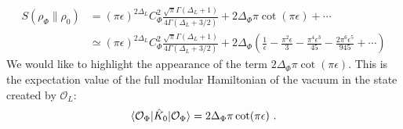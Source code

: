 \documentclass[11pt]{article}
\newcommand{\ep}{\epsilon}
\newcommand{\mO}{\mathcal{O}}
\newcommand{\nn}{\nonumber}
\newcommand{\lb}{\left(}
\newcommand{\rb}{\right)}
\begin{document}
\begin{align}
  S(\rho_\Phi\|\rho_0)&=(\pi \ep)^{2\Delta_L}C_{\Phi}^2\frac{\sqrt{\pi}\Gamma(\Delta_L+1)}{4\Gamma(\Delta_L+3/2)} + 2\Delta_\Phi \pi \cot(\pi \ep) + \cdots \nn \\ 
&\simeq (\pi \ep)^{2\Delta_L}C_{\Phi}^2\frac{\sqrt{\pi}\Gamma(\Delta_L+1)}{4\Gamma(\Delta_L+3/2)}  +2\Delta_\Phi\lb \frac{1}{\ep} - \frac{\pi^2 \ep}{3} - \frac{\pi^4 \ep^3}{45} - \frac{2\pi^6 \ep^5}{945} + \cdots\rb 
\end{align}
We would like to highlight the appearance of the term $2\Delta_\Phi\pi \cot(\pi \ep)$. This is the expectation value of the full modular Hamiltonian of the vacuum in the state created by $\mO_{L}$:
\begin{align}
    \braket{\mO_\Phi|\hat{K}_0|\mO_\Phi}=2\Delta_\Phi\pi\cot(\pi \ep)\ .
\end{align}

    
\end{document}
